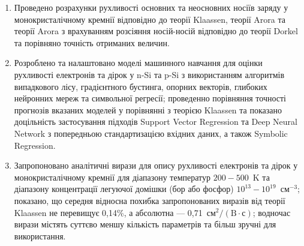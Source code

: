 \documentclass[14pt,a4paper,titlepage,oneside]{book}
\numberwithin{equation}{part}
\begin{document}
  \begin{enumerate}

    \item Проведено розрахунки рухливості основних та неосновних носіїв заряду у монокристалічному кремнії відповідно до теорії Klaassen,
    теорії Arora та теорії Arora з врахуванням розсіяння носій-носій відповідно до теорії Dorkel та порівняно точність отриманих величин.
    \item Розроблено та налаштовано моделі машинного навчання для оцінки рухливості електронів та дірок у n-Si та p-Si з використанням алгоритмів випадкового лісу,
    градієнтного бустинга, опорних векторів, глибоких нейронних мереж та символьної регресії;
    проведенно порівняння точності прогнозів вказаних моделей у порівнянні з теорією Klaassen та показано доцільність застосування підходів Support Vector Regression
    та Deep Neural Network з попередньою стандартизацією вхідних даних, а також Symbolic Regression.
    \item Запропоновано аналітичні вирази для опису рухливості електронів та дірок у монокристалічному кремнії для діапазону температур $200-500$~K
    та діапазону концентрації легуючої домішки (бор або фосфор) $10^{13}-10^{19}$~см$^{-3}$;
    показано, що середня відносна похибка запропонованих виразів від теорії Klaassen не перевищує 0,14\%,
    а абсолютна --- 0,71~$\text{см}^2/(\text{B}\cdot\text{с})$;
    водночас вирази містять суттєво меншу кількість параметрів та більш зручні для використання.
  \end{enumerate}





\end{document}
